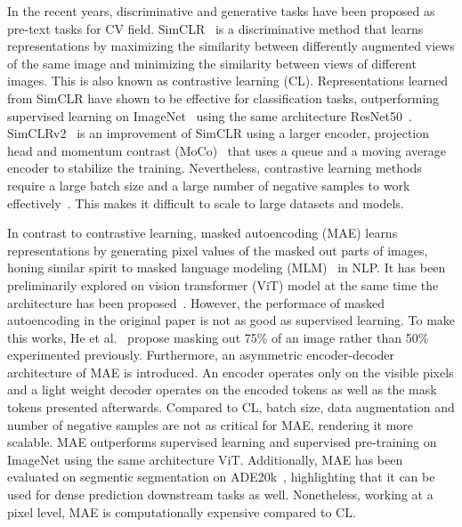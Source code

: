 \documentclass[a4paper,11pt,oneside]{report}
\begin{document}
In the recent years, discriminative and generative tasks have been proposed as pre-text tasks for CV field. SimCLR~\cite{Chen2020Simple} is a discriminative method that learns representations by maximizing the similarity between differently augmented views of the same image and minimizing the similarity between views of different images. This is also known as contrastive learning (CL). Representations learned from SimCLR have shown to be effective for classification tasks, outperforming supervised learning on ImageNet~\cite{Russakovsky2015} using the same architecture ResNet50~\cite{He2016}. SimCLRv2~\cite{Chen2020} is an improvement of SimCLR using a larger encoder, projection head and momentum contrast (MoCo)~\cite{He2020} that uses a queue and a moving average encoder to stabilize the training. Nevertheless, contrastive learning methods require a large batch size and a large number of negative samples to work effectively~\cite{Chen2020Simple}. This makes it difficult to scale to large datasets and models. 

In contrast to contrastive learning, masked autoencoding (MAE) learns representations by generating pixel values of the masked out parts of images, honing similar spirit to masked language modeling (MLM)~\cite{Devlin2019} in NLP. It has been preliminarily explored on vision transformer (ViT) model at the same time the architecture has been proposed~\cite{Dosovitskiy2020vit}. However, the performace of masked autoencoding in the original paper is not as good as supervised learning. To make this works, He et al.~\cite{He2022} propose masking out 75\% of an image rather than 50\% experimented previously. Furthermore, an asymmetric encoder-decoder architecture of MAE is introduced. An encoder operates only on the visible pixels and a light weight decoder operates on the encoded tokens as well as the mask tokens presented afterwards. Compared to CL, batch size, data augmentation and number of negative samples are not as critical for MAE, rendering it more scalable. MAE outperforms supervised learning and supervised pre-training on ImageNet using the same architecture ViT. Additionally, MAE has been evaluated on segmentic segmentation on ADE20k~\cite{Zhou2018}, highlighting that it can be used for dense prediction downstream tasks as well. Nonetheless, working at a pixel level, MAE is computationally expensive compared to CL.
\end{document}
